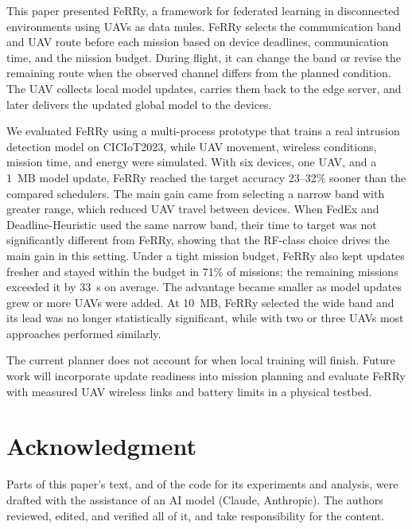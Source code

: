 \documentclass[conference]{IEEEtran}
\newcommand{\sysname}{FeRRy}
\begin{document}
This paper presented \sysname{}, a framework for federated learning in
disconnected environments using UAVs as data mules. \sysname{} selects the
communication band and UAV route before each mission based on device deadlines,
communication time, and the mission budget. During flight, it can change the
band or revise the remaining route when the observed channel differs from the
planned condition. The UAV collects local model updates, carries them back to
the edge server, and later delivers the updated global model to the devices.

We evaluated \sysname{} using a multi-process prototype that trains a real
intrusion detection model on CICIoT2023, while UAV movement, wireless
conditions, mission time, and energy were simulated. With six devices, one UAV,
and a 1~MB model update, \sysname{} reached the target accuracy 23--32\% sooner
than the compared schedulers. The main gain came from selecting a narrow band
with greater range, which reduced UAV travel between devices. When FedEx and
Deadline-Heuristic used the same narrow band, their time to target was not
significantly different from \sysname{}, showing that the RF-class choice
drives the main gain in this setting. Under a tight mission budget, \sysname{}
also kept updates fresher and stayed within the budget in 71\% of missions; the
remaining missions exceeded it by 33~s on average. The advantage became smaller
as model updates grew or more UAVs were added. At 10~MB, \sysname{} selected
the wide band and its lead was no longer statistically significant, while with
two or three UAVs most approaches performed similarly.

The current planner does not account for when local training will finish.
Future work will incorporate update readiness into mission planning and evaluate
\sysname{} with measured UAV wireless links and battery limits in a physical
testbed.

\section*{Acknowledgment}
Parts of this paper's text, and of the code for its experiments and analysis,
were drafted with the assistance of an AI model (Claude, Anthropic). The authors
reviewed, edited, and verified all of it, and take responsibility for the
content.
\end{document}
